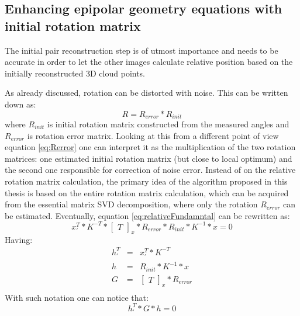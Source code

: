 \subsection{Enhancing epipolar geometry equations with initial rotation matrix} \label{sec:EpipolarEquation}
The initial pair reconstruction step is of utmost importance and needs to be accurate in order to let the other images calculate relative position based on the initially reconstructed 3D cloud points.

As already discussed, rotation can be distorted with noise. This can be written down as:
\begin{equation} \label{eq:Rerror}
R = R_{error} * R_{init} 
\end{equation}
where $R_{init}$ is initial rotation matrix constructed from the measured angles and $R_{error}$ is rotation error matrix.
Looking at this from a different point of view equation \ref{eq:Rerror} one can interpret it as the multiplication of the two rotation matrices: 
one estimated initial rotation matrix (but close to local optimum) and the second one responsible for correction of noise error. 
Instead of on the relative rotation matrix calculation, the primary idea of the algorithm proposed in this thesis is based on the entire rotation matrix calculation, which can be acquired from the essential matrix SVD decomposition, where only the rotation $R_{error}$ can be estimated. Eventually, equation \ref{eq:relativeFundamntal} can be rewritten as:
\begin{equation} \label{eq:relativeFundamntalEnhanced}
{x}_{'}^{T} * K^{-T} * \begin{bmatrix}T\end{bmatrix}_{x} * R_{error} * R_{init} * K^{-1} * x = 0
\end{equation}
Having:
\begin{equation} \label{eq:leftRelative}
\begin{array}{lcl}
h_{'}^{T} &=& {x}_{'}^{T} * K^{-T} \\
h &=& R_{init} * K^{-1} * x \\
G &=& \begin{bmatrix}T\end{bmatrix}_{x} * R_{error} \\
\end{array}
\end{equation}
With such notation one can notice that:
\begin{equation} \label{eq:alternativeEnhancedEquation}
{h}_{'}^{T} * G * h = 0
\end{equation}
